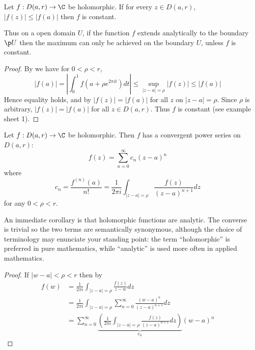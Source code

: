 \documentclass[a4paper]{article}
\begin{document}
\begin{theorem}
  \label{thm:local maximum principle}
  Let \(f: D(a, r) \to \C\) be holomorphic. If for every \(z \in D(a, r)\), \(|f(z)| \leq |f(a)|\) then \(f\) is constant.
\end{theorem}

Thus on a open domain \(U\), if the function \(f\) extends analytically to the boundary \(\p U\) then the maximum can only be achieved on the boundary \(U\), unless \(f\) is constant.

\begin{proof}
  By  we have for \(0 < \rho < r\),
  \[
    |f(a)|
    = \left| \int_0^1 f(a + \rho e^{2\pi it}) dt \right|
    \leq \sup_{|z - a| = \rho} |f(z)|
    \leq |f(a)|
  \]
  Hence equality holds, and by  \(|f(z)| = |f(a)|\) for all \(z\) on \(|z - a| = \rho\). Since \(\rho\) is arbitrary, \(|f(z)| = |f(a)|\) for all \(z \in D(a, r)\). Thus \(f\) is constant (see example sheet 1).
\end{proof}

\begin{theorem}
  \label{thm:Taylor}
  Let \(f: D(a, r) \to \C\) be holomorphic. Then \(f\) has a convergent power series on \(D(a, r)\):
  \[
    f(z) = \sum_{n = 0}^\infty c_n (z - a)^n
  \]
  where
  \[
    c_n = \frac{f^{(n)}(a)}{n!} = \frac{1}{2\pi i} \int_{|z - a| = \rho} \frac{f(z)}{(z - a)^{n + 1}} dz
  \]
  for any \(0 < \rho < r\).
\end{theorem}

An immediate corollary is that holomorphic functions are analytic. The converse is trivial so the two terms are semantically synonymous, although the choice of terminology may enunciate your standing point: the term ``holomorphic'' is preferred in pure mathematics, while ``analytic'' is used more often in applied mathematics.

\begin{proof}
  If \(|w - a| < \rho < r\) then by 
  \begin{align*}
    f(w) &= \frac{1}{2\pi i} \int_{|z - a| = \rho} \frac{f(z)}{z - w} dz \\
         &= \frac{1}{2\pi i} \int_{|z - a| = \rho} \sum_{n = 0}^\infty \frac{(w - a)^n}{(z - a)^{n + 1}} dz \\
         &= \sum_{n = 0}^\infty \underbrace{\left( \frac{1}{2\pi i} \int_{|z - a| = \rho} \frac{f(z)}{(z - a)^{n + 1}} dz \right)}_{c_n} (w - a)^n
  \end{align*}
\end{proof}
\end{document}
